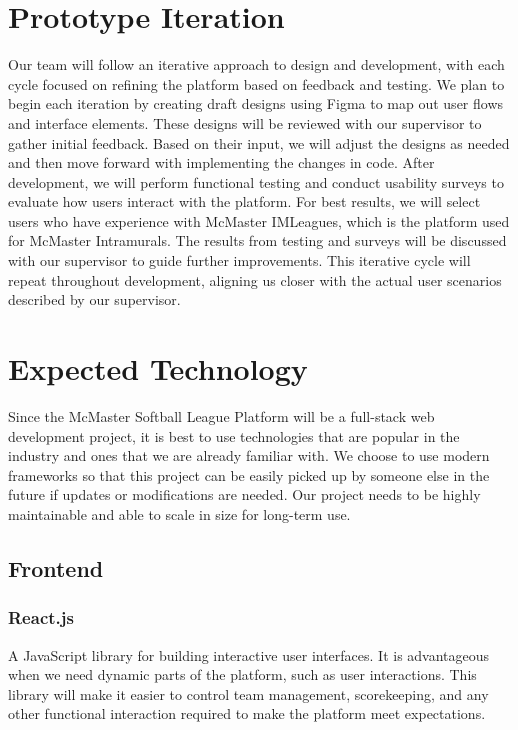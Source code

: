\documentclass{article}
\begin{document}
\section{Prototype Iteration}

Our team will follow an iterative approach to design and development, with each cycle focused on refining the platform based on feedback and testing. We plan to begin each iteration by creating draft designs using Figma to map out user flows and interface elements. These designs will be reviewed with our supervisor to gather initial feedback. Based on their input, we will adjust the designs as needed and then move forward with implementing the changes in code. After development, we will perform functional testing and conduct usability surveys to evaluate how users interact with the platform. For best results, we will select users who have experience with McMaster IMLeagues, which is the platform used for McMaster Intramurals. The results from testing and surveys will be discussed with our supervisor to guide further improvements. This iterative cycle will repeat throughout development, aligning us closer with the actual user scenarios described by our supervisor.

\section{Expected Technology}
Since the McMaster Softball League Platform will be a full-stack web development project, it is best to use technologies that are popular in the industry and ones that we are already familiar with. We choose to use modern frameworks so that this project can be easily picked up by someone else in the future if updates or modifications are needed. Our project needs to be highly maintainable and able to scale in size for long-term use.

\subsection{Frontend}
\subsubsection*{React.js}
A JavaScript library for building interactive user interfaces. It is advantageous when we need dynamic parts of the platform, such as user interactions. This library will make it easier to control team management, scorekeeping, and any other functional interaction required to make the platform meet expectations.
\end{document}
